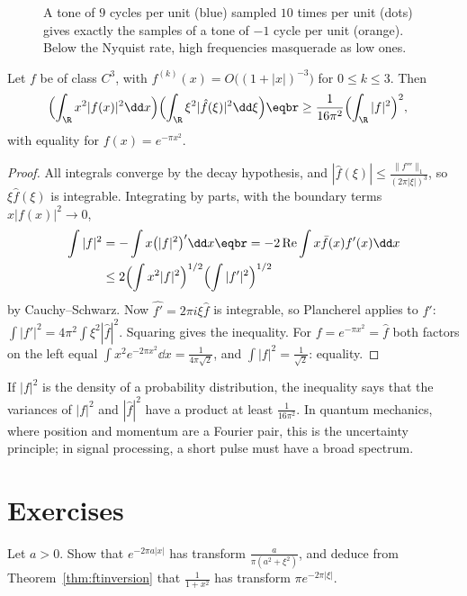\begin{figure}[ht]
\centering
{}
\caption{A tone of $9$ cycles per unit (blue) sampled $10$ times per unit (dots) gives exactly the samples of a tone of $-1$ cycle
per unit (orange). Below the Nyquist rate, high frequencies masquerade as low ones.}
\label{fig:alias}
\end{figure}

\begin{theorem}\label{thm:heisenberg}
Let $f$ be of class $C^3$, with $f^{(k)}(x)=O\bigl((1+|x|)^{-3}\bigr)$ for $0\le k\le3$. Then
\[
\begin{aligned}\Bigl(\int_{\R}x^2|f(x)|^2\dd x\Bigr)&\Bigl(\int_{\R}\xi^2|\hat f(\xi)|^2\dd\xi\Bigr)\eqbr\ge\frac1{16\pi^2}\Bigl(\int_{\R}|f|^2\Bigr)^2,\end{aligned}
\]
with equality for $f(x)=e^{-\pi x^2}$.
\end{theorem}
\begin{proof}
All integrals converge by the decay hypothesis, and $|\hat f(\xi)|\le\frac{\|f'''\|_1}{(2\pi|\xi|)^3}$, so $\xi\hat f(\xi)$ is integrable. Integrating by parts,
with the boundary terms $x|f(x)|^2\to0$,
\[
\begin{aligned}\int|f|^2&=-\int x\bigl(|f|^2\bigr)'\dd x\eqbr=-2\operatorname{Re}\int x\bar f(x)f'(x)\dd x\\&\le2\Bigl(\int x^2|f|^2\Bigr)^{1/2}\Bigl(\int|f'|^2\Bigr)^{1/2}\end{aligned}
\]
by Cauchy--Schwarz. Now $\widehat{f'}=2\pi i\xi\hat f$ is integrable, so Plancherel applies to $f'$: $\int|f'|^2=4\pi^2\int\xi^2|\hat f|^2$. Squaring gives the
inequality. For $f=e^{-\pi x^2}=\hat f$ both factors on the left equal $\int x^2e^{-2\pi x^2}\dd x=\frac1{4\pi\sqrt2}$, and $\int|f|^2=\frac1{\sqrt2}$: equality.
\end{proof}

If $|f|^2$ is the density of a probability distribution, the inequality says that the variances of $|f|^2$ and $|\hat f|^2$ have a
product at least $\frac1{16\pi^2}$. In quantum mechanics, where position and momentum are a Fourier pair, this is the uncertainty
principle; in signal processing, a short pulse must have a broad spectrum.

\section{Exercises}

\begin{exercise}[$\star$]\label{ex:lorentz}
Let $a>0$. Show that $e^{-2\pi a|x|}$ has transform $\frac a{\pi(a^2+\xi^2)}$, and deduce from Theorem~\ref{thm:ftinversion} that $\frac1{1+x^2}$ has transform $\pi e^{-2\pi|\xi|}$.
\end{exercise}

